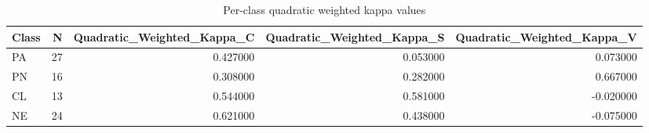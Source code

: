 \begin{table}
\caption{Per-class quadratic weighted kappa values}
\label{tab:rq1-class-kappa}
\begin{tabular}{lrrrr}
\toprule
Class & N & Quadratic_Weighted_Kappa_C & Quadratic_Weighted_Kappa_S & Quadratic_Weighted_Kappa_V \\
\midrule
PA & 27 & 0.427000 & 0.053000 & 0.073000 \\
PN & 16 & 0.308000 & 0.282000 & 0.667000 \\
CL & 13 & 0.544000 & 0.581000 & -0.020000 \\
NE & 24 & 0.621000 & 0.438000 & -0.075000 \\
\bottomrule
\end{tabular}
\end{table}
